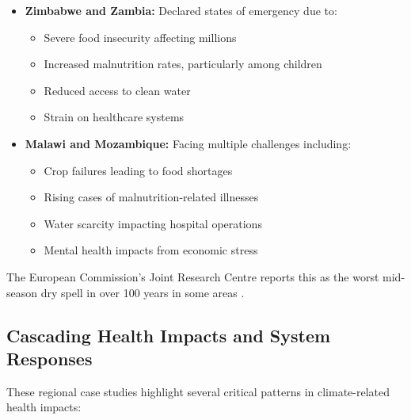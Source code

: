 \begin{itemize}
    \item \textbf{Zimbabwe and Zambia:} Declared states of emergency due to:
    \begin{itemize}
        \item Severe food insecurity affecting millions
        \item Increased malnutrition rates, particularly among children
        \item Reduced access to clean water
        \item Strain on healthcare systems
    \end{itemize}
    
    \item \textbf{Malawi and Mozambique:} Facing multiple challenges including:
    \begin{itemize}
        \item Crop failures leading to food shortages
        \item Rising cases of malnutrition-related illnesses
        \item Water scarcity impacting hospital operations
        \item Mental health impacts from economic stress
    \end{itemize}
\end{itemize}

The European Commission's Joint Research Centre reports this as the worst mid-season dry spell in over 100 years in some areas \citep{jrc2024drought}.

\subsection{Cascading Health Impacts and System Responses}

These regional case studies highlight several critical patterns in climate-related health impacts:

